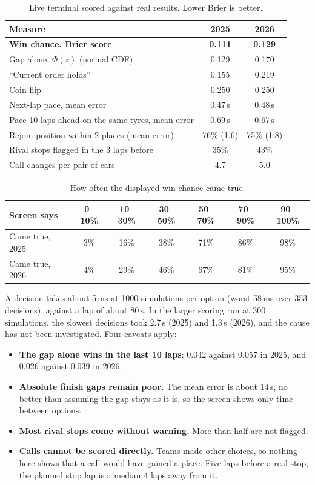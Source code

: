 \documentclass[11pt,a4paper]{article}
\begin{document}
\begin{table}[H]
\centering
\begin{tabular}{@{}lcc@{}}
\toprule
Measure & 2025 & 2026 \\
\midrule
\textbf{Win chance, Brier score} & \textbf{0.111} & \textbf{0.129} \\
Gap alone, $\Phi(z)$ (normal CDF) & 0.129 & 0.170 \\
``Current order holds'' & 0.155 & 0.219 \\
Coin flip & 0.250 & 0.250 \\
\midrule
Next-lap pace, mean error & 0.47\,s & 0.48\,s \\
Pace 10 laps ahead on the same tyres, mean error & 0.69\,s & 0.67\,s \\
Rejoin position within 2 places (mean error) & 76\% (1.6) & 75\% (1.8) \\
Rival stops flagged in the 3 laps before & 35\% & 43\% \\
Call changes per pair of cars & 4.7 & 5.0 \\
\bottomrule
\end{tabular}
\caption{Live terminal scored against real results. Lower Brier is better.}
\end{table}

\begin{table}[H]
\centering
\begin{tabular}{@{}lcccccc@{}}
\toprule
Screen says & 0--10\% & 10--30\% & 30--50\% & 50--70\% & 70--90\% & 90--100\% \\
\midrule
Came true, 2025 & 3\% & 16\% & 38\% & 71\% & 86\% & 98\% \\
Came true, 2026 & 4\% & 29\% & 46\% & 67\% & 81\% & 95\% \\
\bottomrule
\end{tabular}
\caption{How often the displayed win chance came true.}
\end{table}

A decision takes about 5\,ms at 1000 simulations per option (worst 58\,ms over 353 decisions),
against a lap of about 80\,s. In the larger scoring run at 300 simulations, the slowest decisions
took 2.7\,s (2025) and 1.3\,s (2026), and the cause has not been investigated. Four caveats apply:
\begin{itemize}
  \item \textbf{The gap alone wins in the last 10 laps}: 0.042 against 0.057 in 2025, and
        0.026 against 0.039 in 2026.
  \item \textbf{Absolute finish gaps remain poor.} The mean error is about 14\,s, no better than
        assuming the gap stays as it is, so the screen shows only time between options.
  \item \textbf{Most rival stops come without warning.} More than half are not flagged.
  \item \textbf{Calls cannot be scored directly.} Teams made other choices, so nothing here
        shows that a call would have gained a place. Five laps before a real stop, the planned
        stop lap is a median 4 laps away from it.
\end{itemize}
\end{document}
